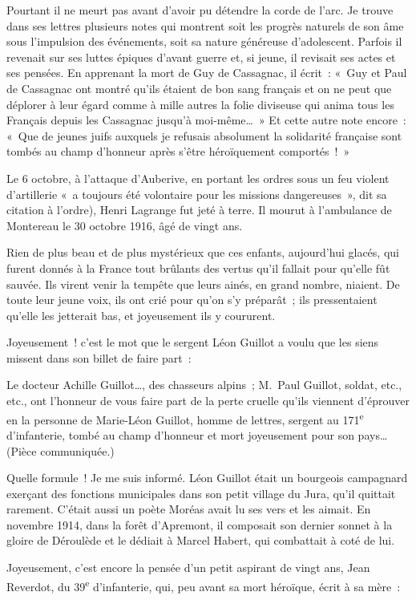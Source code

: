 \documentclass[french,twoside]{book} %
\newenvironment{quoteblock}%
  {\begin{quoting}}
  {\end{quoting}}
\newenvironment{quotebar}{%
    \def\FrameCommand{{\color{rubric!10!}\vrule width 0.5em} \hspace{0.9em}}%
    \def\OuterFrameSep{\itemsep} %
    \MakeFramed {\advance\hsize-\width \FrameRestore}
  }%
  {%
    \endMakeFramed
  }
\renewenvironment{quoteblock}%
  {%
    \savenotes
    \setstretch{0.9}
    \normalfont
    \begin{quotebar}
  }
  {%
    \end{quotebar}
    \spewnotes
  }
\begin{document}
Pourtant il ne meurt pas avant d’avoir pu détendre la corde de l’arc. Je trouve dans ses lettres plusieurs notes qui montrent soit les progrès naturels de son âme sous l’impulsion des événements, soit sa nature généreuse d’adolescent. Parfois il revenait sur ses luttes épiques d’avant guerre et, si jeune, il revisait ses actes et ses pensées. En apprenant la mort de Guy de Cassagnac, il écrit : « Guy et Paul de Cassagnac ont montré qu’ils étaient de bon sang français et on ne peut que déplorer à leur égard comme à mille autres la folie diviseuse qui anima tous les Français depuis les Cassagnac jusqu’à moi-même… » Et cette autre note encore : « Que de jeunes juifs auxquels je refusais absolument la solidarité française sont tombés au champ d’honneur après s’être héroïquement comportés ! »‌\par
Le 6 octobre, à l’attaque d’Auberive, en portant les ordres sous un feu violent d’artillerie « a toujours été volontaire pour les missions dangereuses », dit sa citation à l’ordre), Henri Lagrange fut jeté à terre. Il mourut à l’ambulance de Montereau le 30 octobre 1916, âgé de vingt ans.‌\par
Rien de plus beau et de plus mystérieux que ces enfants, aujourd’hui glacés, qui furent donnés à la France tout brûlants des vertus qu’il fallait pour qu’elle fût sauvée. Ils virent venir la tempête que leurs ainés, en grand nombre, niaient. De toute leur jeune voix, ils ont crié pour qu’on s’y préparât ; ils pressentaient qu’elle les jetterait bas, et joyeusement ils y coururent.‌\par
Joyeusement ! c’est le mot que le sergent Léon Guillot a voulu que les siens missent dans son billet de faire part :‌\par

\begin{quoteblock}
 \noindent Le docteur Achille Guillot…, des chasseurs alpins ; M. Paul Guillot, soldat, etc., etc., ont l’honneur de vous faire part de la perte cruelle qu’ils viennent d’éprouver en la personne de Marie-Léon Guillot, homme de lettres, sergent au 171\textsuperscript{e} d’infanterie, tombé au champ d’honneur et mort joyeusement pour son pays… (Pièce communiquée.)‌
 \end{quoteblock}

\noindent Quelle formule ! Je me suis informé. Léon Guillot était un bourgeois campagnard exerçant des fonctions municipales dans son petit village du Jura, qu’il quittait rarement. C’était aussi un poète Moréas avait lu ses vers et les aimait. En novembre 1914, dans la forêt d’Apremont, il composait son dernier sonnet à la gloire de Déroulède et le dédiait à Marcel Habert, qui combattait à coté de lui.‌\par
Joyeusement, c’est encore la pensée d’un petit aspirant de vingt ans, Jean Reverdot, du 39\textsuperscript{e} d’infanterie, qui, peu avant sa mort héroïque, écrit à sa mère :‌\par
\end{document}
